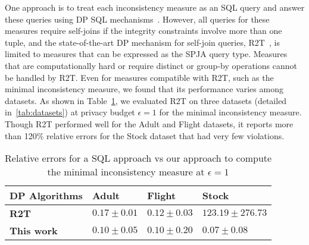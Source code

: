 
One approach is to treat each inconsistency measure as an SQL query and answer these queries using DP SQL mechanisms~\cite{tao2020computing,dong2022r2t,kotsogiannis2019privatesql,johnson2018towards}. However, all queries for these measures require self-joins if the integrity constraints involve more than one tuple, and the state-of-the-art DP mechanism for self-join queries, R2T~\cite{dong2022r2t}, is limited to measures that can be expressed as the SPJA query type. Measures that are computationally hard or require distinct or group-by operations cannot be handled by R2T.  Even for measures compatible with R2T, such as the minimal inconsistency measure, we found that its performance varies among datasets. As shown in Table~\ref{tab:intro_comparison}, we evaluated R2T on three datasets (detailed in~\cref{tab:datasets}) at privacy budget $\epsilon=1$ for the minimal inconsistency measure. Though R2T performed well for the Adult and Flight datasets, it reports more than 120\% relative errors for the Stock dataset that had very few violations. 

\begin{table}
\centering
\begin{tabular}{|l|l|l|l|}
\hline
\textbf{DP Algorithms} & \textbf{Adult}                  & \textbf{Flight}                 & \textbf{Stock}                  \\ \hline
\textbf{R2T~\cite{dong2022r2t}}           & $0.17\pm 0.01$ & $0.12\pm0.03$ & $123.19\pm 276.73$    \\ \hline
\textbf{This work}  & $0.10 \pm 0.05$ & $0.10 \pm 0.20$  & $0.07\pm 0.08$ \\ \hline
\end{tabular}
  \caption{Relative errors for a SQL approach vs our approach to compute the minimal inconsistency measure at $\epsilon=1$} \label{tab:intro_comparison}
\end{table}


